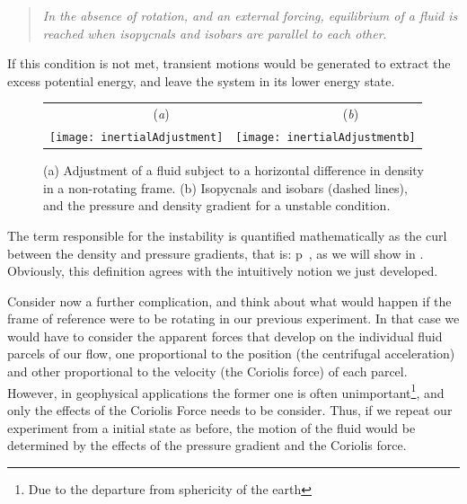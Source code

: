 \begin{quote}
\emph{In the absence of rotation, and an external forcing, equilibrium of
a fluid is reached when isopycnals and isobars are parallel to each
other}.
\end{quote}


If this condition is not met, transient motions would be generated to extract the excess  potential energy, and leave the system in its lower energy state.

\begin{figure}[t]
\begin{center}
 \begin{tabular}{cc}
        ~~~~~~~~(\textit{a})                        &   ~~~~~~~~(\textit{b}) \\
    \texttt{[image: inertialAdjustment]}
    & \texttt{[image: inertialAdjustmentb]}

  \end{tabular}
\end{center}
\caption{
(a) Adjustment of a fluid subject to a horizontal difference in density
    in a non-rotating frame.
(b) Isopycnals and isobars (dashed lines), and the pressure and density
    gradient for a unstable condition.
        }
\label{f:drivedrag}
\end{figure}

The term responsible for the instability is quantified mathematically as
the curl between the density and pressure gradients, that is:
\beq
\nabla \rho \times \nabla p
\,,
as we will show in . Obviously, this definition
agrees with the intuitively notion we just developed.

Consider now a further complication, and think about what would happen if
the frame of reference were to be rotating in our previous experiment. In
that case we would have to consider the apparent forces that develop on
the individual fluid parcels of our flow, one proportional to the
position (the centrifugal acceleration) and other proportional to the
velocity (the Coriolis force) of each parcel. However, in geophysical
applications the former one is often unimportant\footnote{Due to the
departure from sphericity of the earth}, and only the
effects of the Coriolis Force needs to be consider. Thus, if we repeat
our experiment from a initial state as before, the motion of the fluid
would be determined by the effects of the pressure gradient and the
Coriolis force.

